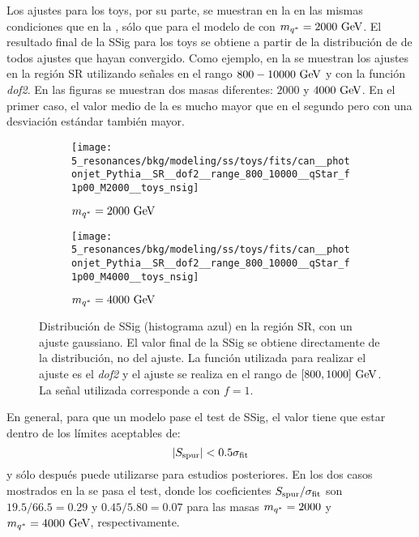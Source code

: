 Los ajustes para los toys, por su parte, se muestran en la \Fig{\ref{fig:bkg:modeling:sigbkg:sstest:sstest_toys_examples}} en las mismas condiciones que en la \Fig{\ref{fig:bkg:modeling:sigbkg:sstest:sstest_asimov_examples}}, sólo que para el modelo de \qstar con \(m_{q^*}=2000~\text{GeV}\). El resultado final de la \ac{SSig} para los toys se obtiene a partir de la distribución de \sspur de todos ajustes que hayan convergido. Como ejemplo, en la \Fig{\ref{fig:bkg:modeling:sigbkg:sstest:sstest_toys_distributions}} se muestran los ajustes en la región SR utilizando señales \qstar en el rango \(800-10000~\text{GeV}\) y con la función \textit{dof2}. En las figuras se muestran dos masas \qstar diferentes: \(2000\) y \(4000~\text{GeV}\). En el primer caso, el valor medio de la \sspur es mucho mayor que en el segundo pero con una desviación estándar también mayor.

\begin{figure}[ht!]
    \centering
    \begin{subfigure}[h]{0.49\linewidth}
        \centering
        \texttt{[image: 5\_resonances/bkg/modeling/ss/toys/fits/can\_\_photonjet\_Pythia\_\_SR\_\_dof2\_\_range\_800\_10000\_\_qStar\_f1p00\_M2000\_\_toys\_nsig]}
        \caption{\(m_{q^*} = 2000~\text{GeV}\)}
    \end{subfigure}
    \hfill
    \begin{subfigure}[h]{0.49\linewidth}
        \centering
        \texttt{[image: 5\_resonances/bkg/modeling/ss/toys/fits/can\_\_photonjet\_Pythia\_\_SR\_\_dof2\_\_range\_800\_10000\_\_qStar\_f1p00\_M4000\_\_toys\_nsig]}
        \caption{\(m_{q^*} = 4000~\text{GeV}\)}
    \end{subfigure}
    \caption{Distribución de \ac{SSig} (histograma azul) en la región SR, con un ajuste gaussiano. El valor final de la \ac{SSig} se obtiene directamente de la distribución, no del ajuste. La función utilizada para realizar el ajuste es el \textit{dof2} y el ajuste se realiza en el rango de \([800, 1000]~\text{GeV}\). La señal utilizada corresponde a \qstar con \(f=1\).}
    \label{fig:bkg:modeling:sigbkg:sstest:sstest_toys_distributions}
\end{figure}


En general, para que un modelo pase el test de \ac{SSig}, el valor \sspur tiene que estar dentro de los límites aceptables de:
\begin{equation}
    \label{eq:bkg:modeling:sigbkg:sstest:condition}
    |S_{\text{spur}}| < 0.5 \sigma_{\text{fit}}
\end{equation}
y sólo después puede utilizarse para estudios posteriores. En los dos casos mostrados en la \Fig{\ref{fig:bkg:modeling:sigbkg:sstest:sstest_toys_distributions}} se pasa el test, donde los coeficientes \(S_{\text{spur}} / \sigma_{\text{fit}}\) son \(19.5 / 66.5 = 0.29\) y \(0.45 / 5.80 = 0.07\) para las masas \(m_{q^*} = 2000\) y \(m_{q^*} = 4000~\text{GeV}\), respectivamente.

